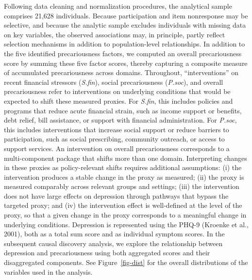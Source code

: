 \documentclass[
]{article}
\begin{document}
Following data cleaning and normalization procedures, the analytical
sample comprises 21,628 individuals.
\textcolor{BrickRed}{Because participation and item nonresponse may be selective, and because the analytic sample excludes individuals with missing data on key variables, the observed associations may, in principle, partly reflect selection mechanisms in addition to population-level relationships.}
In addition to the five identified precariousness factors, we computed
an overall precariousness score by summing these five factor scores,
thereby capturing a composite measure of accumulated precariousness
across domains.
\textcolor{BrickRed}{Throughout, “interventions” on recent financial stressors (\textit{S.fin}), social precariousness (\textit{P.soc}), and overall precariousness refer to interventions on underlying conditions that would be expected to shift these measured proxies. For \textit{S.fin}, this includes policies and programs that reduce acute financial strain, such as income support or benefits, debt relief, bill assistance, or support with financial administration. For \textit{P.soc}, this includes interventions that increase social support or reduce barriers to participation, such as social prescribing, community outreach, or access to support services. An intervention on overall precariousness corresponds to a multi-component package that shifts more than one domain. Interpreting changes in these proxies as policy-relevant shifts requires additional assumptions: (i) the intervention produces a stable change in the proxy as measured; (ii) the proxy is measured comparably across relevant groups and settings; (iii) the intervention does not have large effects on depression through pathways that bypass the targeted proxy; and (iv) the intervention effect is well-defined at the level of the proxy, so that a given change in the proxy corresponds to a meaningful change in underlying conditions.}
Depression is represented using the PHQ-9 (Kroenke et al., 2001), both
as a total sum score and as individual symptom scores. In the subsequent
causal discovery analysis, we explore the relationship between
depression and precariousness using both aggregated scores and their
disaggregated components. See Figure~\ref{fig-dist} for the overall
distributions of the variables used in the analysis.
\end{document}

